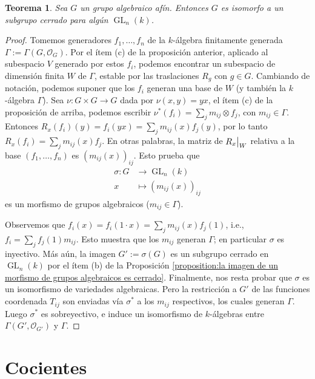 \documentclass[spanish,12pt]{amsart}
\newtheorem{theorem}{Teorema}[section]
\theoremstyle{definition}
\theoremstyle{remark}
\numberwithin{equation}{section}
\newcommand\rest[2]{{%
  \left.\kern-\nulldelimiterspace %
  #1 %
  \vphantom{\big|} %
  \right|_{#2} %
  }}
\renewcommand{\O}{\mathcal{O}}
\begin{document}
\begin{theorem}\label{th:todo grupo algebraico afin es isomorfo a un subgrupo cerrado de GLn}
Sea $G$ un grupo algebraico afín. Entonces $G$ es isomorfo a un subgrupo cerrado para algún $\operatorname{GL}_n (k)$.
\end{theorem}
\begin{proof}
Tomemos generadores $f_1, \ldots, f_n$ de la $k$-álgebra finitamente generada $\Gamma:= \Gamma (G, \O_G)$. Por el ítem (c) de la proposición anterior, aplicado al subespacio $V$ generado por estos $f_i$, podemos encontrar un subespacio de dimensión finita $W$ de $\Gamma$, estable por las traslaciones $R_g$ con $g \in G$. Cambiando de notación, podemos suponer que los $f_i$ generan una base de $W$ (y también la $k$-álgebra $\Gamma$). Sea $\nu : G \times G \to G$ dada por $\nu (x,y) = yx$, el ítem (c) de la proposición de arriba, podemos escribir $\nu^* (f_i) = \sum_{j} m_{ij} \otimes f_j$, con $m_{ij} \in \Gamma$. Entonces $R_x (f_i) (y) = f_i (y x) = \sum_j m_{ij} (x) f_j (y)$, por lo tanto $R_x (f_i) = \sum_j m_{ij} (x) f_j$. En otras palabras, la matriz de $\rest{R_x} W$ relativa a la base $(f_1, \ldots,f_n)$ es $(m_{ij} (x))_{ij}$. Esto prueba que
\begin{align*}
    \sigma : G &\longrightarrow \operatorname{GL}_n (k) \\
    x &\longmapsto (m_{ij} (x))_{ij}
\end{align*}
es un morfismo de grupos algebraicos ($m_{ij} \in \Gamma$).

Observemos que $f_i (x) = f_i (1 \cdot x) = \sum_{j} m_{ij} (x) f_j (1)$, i.e., $f_i = \sum_j f_j (1) m_{ij}$. Esto muestra que los $m_{ij}$ generan $\Gamma$; en particular $\sigma$ es inyectivo. Más aún, la imagen $G' := \sigma (G)$ es un subgrupo cerrado en $\operatorname{GL}_n (k)$ por el ítem (b) de la Proposición \ref{proposition:la imagen de un morfismo de grupos algebraicos es cerrado}. Finalmente, nos resta probar que $\sigma$ es un isomorfismo de variedades algebraicas. Pero la restricción a $G'$ de las funciones coordenada $T_{ij}$ son enviadas vía $\sigma^*$ a los $m_{ij}$ respectivos, los cuales generan $\Gamma$. Luego $\sigma^*$ es sobreyectivo, e induce un isomorfismo de $k$-álgebras entre $\Gamma (G', \O_{G'})$ y $\Gamma$.
\end{proof}


\section{Cocientes}
\end{document}
